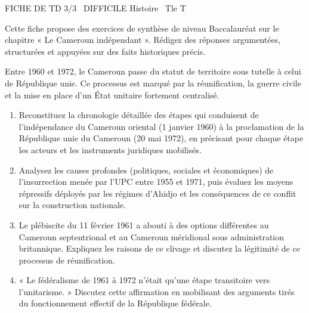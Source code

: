 \documentclass[11pt]{article}
\begin{document}
\begin{tcolorbox}[enhanced,colback=popink,colframe=popink,arc=10pt,boxrule=0pt,left=12pt,right=12pt,top=9pt,bottom=9pt]
{\color{white}\popxbold\small FICHE DE TD 3/3 \textbullet\ DIFFICILE \hfill Histoire \textbullet\ Tle T\par}
\end{tcolorbox}
\vspace{4pt}
Cette fiche propose des exercices de synthèse de niveau Baccalauréat sur le chapitre « Le Cameroun indépendant ». Rédigez des réponses argumentées, structurées et appuyées sur des faits historiques précis.

\begin{exercice}
Entre 1960 et 1972, le Cameroun passe du statut de territoire sous tutelle à celui de République unie. Ce processus est marqué par la réunification, la guerre civile et la mise en place d'un État unitaire fortement centralisé.
\begin{enumerate}
\item Reconstituez la chronologie détaillée des étapes qui conduisent de l'indépendance du Cameroun oriental (1\ier{} janvier 1960) à la proclamation de la République unie du Cameroun (20 mai 1972), en précisant pour chaque étape les acteurs et les instruments juridiques mobilisés.
\item Analysez les causes profondes (politiques, sociales et économiques) de l'insurrection menée par l'UPC entre 1955 et 1971, puis évaluez les moyens répressifs déployés par les régimes d'Ahidjo et les conséquences de ce conflit sur la construction nationale.
\item Le plébiscite du 11 février 1961 a abouti à des options différentes au Cameroun septentrional et au Cameroun méridional sous administration britannique. Expliquez les raisons de ce clivage et discutez la légitimité de ce processus de réunification.
\item « Le fédéralisme de 1961 à 1972 n'était qu'une étape transitoire vers l'unitarisme. » Discutez cette affirmation en mobilisant des arguments tirés du fonctionnement effectif de la République fédérale.
\end{enumerate}
\end{exercice}
\end{document}
